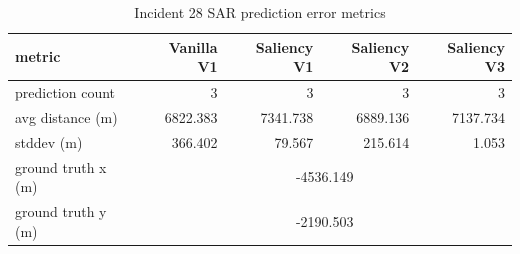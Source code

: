 \begin{table}[ht]
\centering
\caption{Incident 28 SAR prediction error metrics}
\label{tab:sar-incident-28}
\begin{tabular}{lrrrr}
\hline
metric & Vanilla V1 & Saliency V1 & Saliency V2 & Saliency V3 \\
\hline
prediction count & 3 & 3 & 3 & 3 \\
avg distance (m) & 6822.383 & 7341.738 & 6889.136 & 7137.734 \\
stddev (m) & 366.402 & 79.567 & 215.614 & 1.053 \\
ground truth x (m) & \multicolumn{4}{c}{-4536.149} \\
ground truth y (m) & \multicolumn{4}{c}{-2190.503} \\
\hline
\end{tabular}
\end{table}
